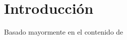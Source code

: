 \documentclass[a4paper,11pt]{report}
\begin{document}
\maketitle
\tableofcontents

\break

\chapter{Introducción}
Basado mayormente en el contenido de \cite{shwartz_understanding_ml}




\end{document}
